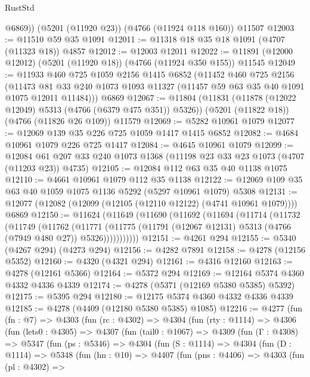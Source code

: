 \begin{lexlean}{RustStd}
\begin{coremodule}
        @6869))
    (@5201 (@11920 @23))
    (@4766 (@11924 @118 @160))
    @11507
@12003 := @11510 @59 @35 @1091
@12011 := @11318 @18 @35 @18 @1091 (@4707 (@11323 @18)) @4857
@12012 := @12003 @12011
@12022 := @11891 (@12000 @12012) (@5201 (@11920 @18)) (@4766 (@11924 @350 @155)) @11545
@12049 := @11933
    @460
    @725
    @1059
    @2156
    @1415
    @6852
    (@11452
      @460
      @725
      @2156
      (@11473 @81 @33 @240 @1073 @1093 @11327 (@11457 @59 @63 @35 @40 @1091 @1075 @12011 @11484)))
    @6869
@12067 := @11804
    (@11831 (@11878 (@12022 @12049) @5313 (@4766 (@6379 @475 @351)) @5326))
    (@5201 (@11822 @18))
    (@4766 (@11826 @26 @109))
    @11579
@12069 := @5282 @10961 @1079
@12077 := @12069 @139 @35 @226 @725 @1059 @1417 @1415 @6852
@12082 := @4684 @10961 @1079 @226 @725 @1417
@12084 := @4645 @10961 @1079
@12099 := @12084 @61 @207 @33 @240 @1073 @1368 (@11198 @23 @33 @23 @1073 (@4707 (@11203 @23)) @4735)
@12105 := @12084 @112 @63 @35 @40 @1138 @1075
@12110 := @4661 @10961 @1079 @112 @35 @1138
@12122 := @12069 @109 @35 @63 @40 @1059 @1075 @1136 @5292 (@5297 @10961 @1079) @5308
@12131 := @12077 (@12082 (@12099 (@12105 (@12110 @12122) (@4741 @10961 @1079)))) @6869
@12150 := @11624
    (@11649
      (@11690
        (@11692
          (@11694
            (@11714
              (@11732
                (@11749
                  (@11762
                    (@11771
                      (@11775
                        (@11791 (@12067 @12131) @5313 (@4766 (@7949 @480 @27)) @5326)))))))))))
@12151 := @4261 @294
@12155 := @5340 (@4267 @294) (@4273 @294)
@12156 := @4282 @7891
@12158 := @4278 (@12156 @5352)
@12160 := @4320 (@4321 @294)
@12161 := @4316 @12160
@12163 := @4278 (@12161 @5366)
@12164 := @5372 @294
@12169 := @12164 @5374 @4360 @4332 @4336 @4339
@12174 := @4278 (@5371 (@12169 @5380 @5385) @5392)
@12175 := @5395 @294
@12180 := @12175 @5374 @4360 @4332 @4336 @4339
@12185 := @4278 (@4409 (@12180 @5380 @5385) @1085)
@12216 := @4277
    (fun (fn : @7) =>
    @4303
      (fun (rc : @4302) =>
      @4304
        (fun (rty : @1114) =>
        @4306
          (fun (lets0 : @4305) =>
          @4307
            (fun (tail0 : @1067) =>
            @4309
              (fun (Γ : @4308) =>
              @5347
                (fun (ps : @5346) =>
                @4304
                  (fun (S : @1114) =>
                  @4304
                    (fun (D : @1114) =>
                    @5348
                      (fun (hn : @10) =>
                      @4407
                        (fun (pns : @4406) =>
                        @4303
                          (fun (pl : @4302) =>

\end{coremodule}
\end{lexlean}
